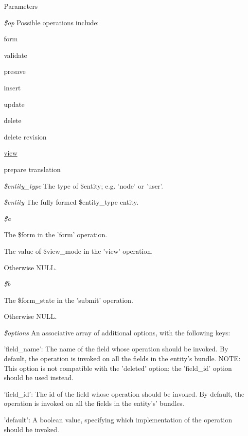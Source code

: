 \begin{DoxyParams}{Parameters}
\item[{\em \$op}]Possible operations include:
\begin{DoxyItemize}
\item form
\item validate
\item presave
\item insert
\item update
\item delete
\item delete revision
\item \hyperlink{classview}{view}
\item prepare translation 
\end{DoxyItemize}\item[{\em \$entity\_\-type}]The type of \$entity; e.g. 'node' or 'user'. \item[{\em \$entity}]The fully formed \$entity\_\-type entity. \item[{\em \$a}]
\begin{DoxyItemize}
\item The \$form in the 'form' operation.
\item The value of \$view\_\-mode in the 'view' operation.
\item Otherwise NULL. 
\end{DoxyItemize}\item[{\em \$b}]
\begin{DoxyItemize}
\item The \$form\_\-state in the 'submit' operation.
\item Otherwise NULL. 
\end{DoxyItemize}\item[{\em \$options}]An associative array of additional options, with the following keys:
\begin{DoxyItemize}
\item 'field\_\-name': The name of the field whose operation should be invoked. By default, the operation is invoked on all the fields in the entity's bundle. NOTE: This option is not compatible with the 'deleted' option; the 'field\_\-id' option should be used instead.
\item 'field\_\-id': The id of the field whose operation should be invoked. By default, the operation is invoked on all the fields in the entity's' bundles.
\item 'default': A boolean value, specifying which implementation of the operation should be invoked.

\end{DoxyItemize}
\end{DoxyParams}
